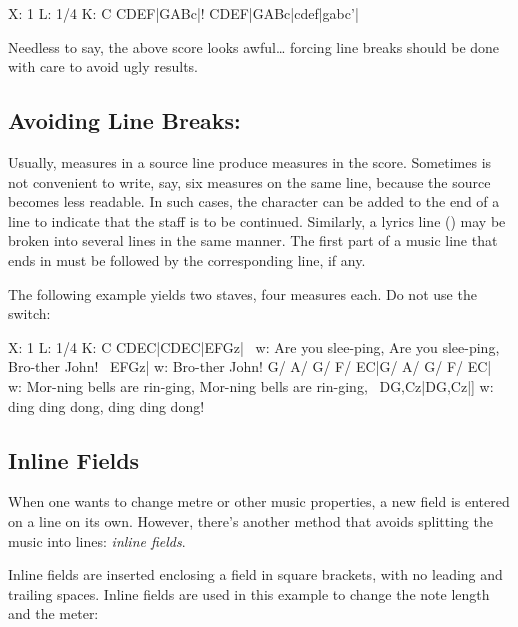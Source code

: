 \documentclass[a4paper,12pt]{book}
\begin{document}
\begin{abcsource}
X: 1
L: 1/4
K: C
CDEF|GABc|! CDEF|GABc|cdef|gabc'|
\end{abcsource}


Needless to say, the above score looks awful{\ldots} forcing line
breaks should be done with care to avoid ugly results.


\subsection{Avoiding Line Breaks: \icmd{\textbackslash{}}}
\label{sec:battute}

Usually,  measures in a source line produce  measures
in the score. Sometimes is not convenient to write, say, six measures
on the same line, because the source becomes less readable. In such
cases, the \car{\bl} character can be added to the end of a line to
indicate that the staff is to be continued. Similarly, a lyrics line
() may be broken into several lines in the same manner. The
first part of a music line that ends in \car{\bl} must be followed by
the corresponding  line, if any.

The following example yields two staves, four measures each. Do not
use the  switch:

\begin{abcsource}
X: 1
L: 1/4
K: C
CDEC|CDEC|EFGz|\ %
w: Are you slee-ping, Are you slee-ping, Bro-ther John!\ %
EFGz|
w: Bro-ther John!
G/ A/ G/ F/ EC|G/ A/ G/ F/ EC|\ %
w: Mor-ning bells are rin-ging, Mor-ning bells are rin-ging,\ %
DG,Cz|DG,Cz|]
w: ding ding dong, ding ding dong!
\end{abcsource}



\subsection{Inline Fields}
\label{sec:inline}

When one wants to change metre or other music properties, a new field
is entered on a line on its own. However, there's another method that
avoids splitting the music into lines: \emph{inline fields}.

Inline fields are inserted enclosing a field in square brackets, with
no leading and trailing spaces. Inline fields are used in this example
to change the note length and the meter:
\end{document}
